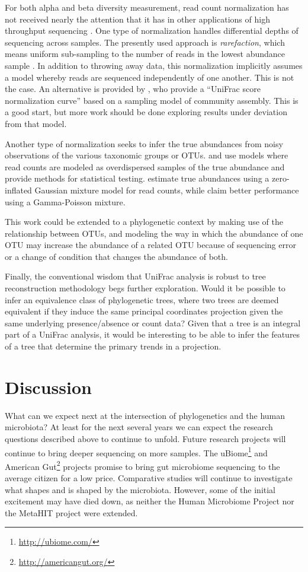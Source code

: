 \documentclass{amsart}
\begin{document}
For both alpha and beta diversity measurement, read count normalization has not received nearly the attention that it has in other applications of high throughput sequencing \citep[such as RNA-Seq, e.g.][]{anders2010differential,robinson2010edger}.
One type of normalization handles differential depths of sequencing across samples.
The presently used approach is \textit{rarefaction}, which means uniform sub-sampling to the number of reads in the lowest abundance sample \citep{schloss2009introducing,caporaso2010qiime}.
In addition to throwing away data, this normalization implicitly assumes a model whereby reads are sequenced independently of one another.
This is not the case.
An alternative is provided by \citet{o2012phylogenetic}, who provide a ``UniFrac score normalization curve'' based on a sampling model of community assembly.
This is a good start, but more work should be done exploring results under deviation from that model.

Another type of normalization seeks to infer the true abundances from noisy observations of the various taxonomic groups or OTUs.
\citet{holmes2012dirichlet} and \citet{la2012hypothesis} use models where read counts are modeled as overdispersed samples of the true abundance and provide methods for statistical testing.
\citet{paulson2013differential} estimate true abundances using a zero-inflated Gaussian mixture model for read counts, while \citet{McMurdie2014-mn} claim better performance using a Gamma-Poisson mixture.

This work could be extended to a phylogenetic context by making use of the relationship between OTUs, and modeling the way in which the abundance of one OTU may increase the abundance of a related OTU because of sequencing error or a change of condition that changes the abundance of both.

Finally, the conventional wisdom that UniFrac analysis is robust to tree reconstruction methodology begs further exploration.
Would it be possible to infer an equivalence class of phylogenetic trees, where two trees are deemed equivalent if they induce the same principal coordinates projection given the same underlying presence/absence or count data?
Given that a tree is an integral part of a UniFrac analysis, it would be interesting to be able to infer the features of a tree that determine the primary trends in a projection.


\section{Discussion}
What can we expect next at the intersection of phylogenetics and the human microbiota?
At least for the next several years we can expect the research questions described above to continue to unfold.
Future research projects will continue to bring deeper sequencing on more samples.
The uBiome\footnote{\url{http://ubiome.com/}} and American Gut\footnote{\url{http://americangut.org/}} projects promise to bring gut microbiome sequencing to the average citizen for a low price.
Comparative studies will continue to investigate what shapes and is shaped by the microbiota.
However, some of the initial excitement may have died down, as neither the Human Microbiome Project nor the MetaHIT project were extended.
\end{document}

